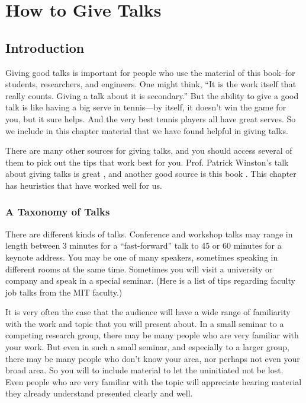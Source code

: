 \chapter{How to Give Talks}
\label{chapter:how_to_give_talks}

\section{Introduction}
Giving good talks is important for people who use the material of this book--for students, researchers, and engineers.
One  might think,  ``It is the work itself that really counts.  Giving a talk about it is secondary.''
But the ability to give a good talk is like having a big serve in tennis—by itself, it doesn’t win the game for you, but it sure helps.  And the very best tennis players all have great serves.  So we include in this chapter material that we have found helpful in giving talks.

There are many other sources for giving talks, and you should access several of them to pick out the tips that work best for you.  Prof. Patrick Winston's talk about giving talks is great \cite{WinstonSpeaks}, and another good source is this book \cite{Hoogterp}.   This chapter has heuristics that have worked well for us.

\subsection{A Taxonomy of Talks}

There are different kinds of talks.  Conference and workshop talks may range in length between 3 minutes for a ``fast-forward'' talk to 45 or 60 minutes for a keynote address.  You may be one of many speakers, sometimes speaking in different rooms at the same time.
Sometimes you will visit a university or company and speak in a special seminar. (Here \cite{MITFacultyJobTalks2022} is a list of tips regarding faculty job talks from the MIT faculty.)

It is very often the case that the audience will have a wide range of familiarity with the work and topic that you will present about.  In a small seminar to a competing research group, there may be many people who are very familiar with your work.  But even in such a small seminar, and especially to a larger group, there may be many people who don't know your area, nor perhaps not even your broad area.  So you will to include material to let the uninitiated not be lost.  Even people who are very  familiar with the topic will appreciate hearing material they already understand presented clearly and well.  

